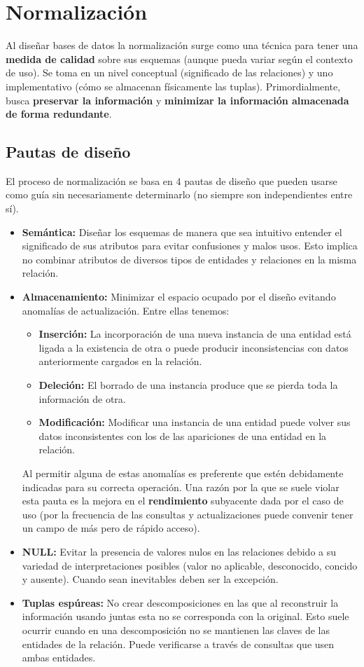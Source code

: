 \section*{Normalización}
Al diseñar bases de datos la normalización surge como una técnica para tener una \textbf{medida de calidad} sobre sus esquemas (aunque pueda variar según el contexto de uso). Se toma en un nivel conceptual (significado de las relaciones) y uno implementativo (cómo se almacenan físicamente las tuplas). Primordialmente, busca \textbf{preservar la información} y \textbf{minimizar la información almacenada de forma redundante}.

\subsection*{Pautas de diseño}
El proceso de normalización se basa en 4 pautas de diseño que pueden usarse como guía sin necesariamente determinarlo (no siempre son independientes entre sí).
\begin{itemize}
    \item \textbf{Semántica:} Diseñar los esquemas de manera que sea intuitivo entender el significado de sus atributos para evitar confusiones y malos usos. Esto implica no combinar atributos de diversos tipos de entidades y relaciones en la misma relación.
    \item \textbf{Almacenamiento:} Minimizar el espacio ocupado por el diseño evitando anomalías de actualización. Entre ellas tenemos:
    \begin{itemize}
        \item \textbf{Inserción:} La incorporación de una nueva instancia de una entidad está ligada a la existencia de otra o puede producir inconsistencias con datos anteriormente cargados en la relación.
        \item \textbf{Deleción:} El borrado de una instancia produce que se pierda toda la información de otra.
        \item \textbf{Modificación:} Modificar una instancia de una entidad puede volver sus datos inconsistentes con los de las apariciones de una entidad en la relación.
    \end{itemize}
    Al permitir alguna de estas anomalías es preferente que estén debidamente indicadas para su correcta operación. Una razón por la que se suele violar esta pauta es la mejora en el \textbf{rendimiento} subyacente dada por el caso de uso (por la frecuencia de las consultas y actualizaciones puede convenir tener un campo de más pero de rápido acceso).
    \item \textbf{NULL:} Evitar la presencia de valores nulos en las relaciones debido a su variedad de interpretaciones posibles (valor no aplicable, desconocido, concido y ausente). Cuando sean inevitables deben ser la excepción.
    \item \textbf{Tuplas espúreas:} No crear descomposiciones en las que al reconstruir la información usando juntas esta no se corresponda con la original. Esto suele ocurrir cuando en una descomposición no se mantienen las claves de las entidades de la relación. Puede verificarse a través de consultas que usen ambas entidades.
\end{itemize}

